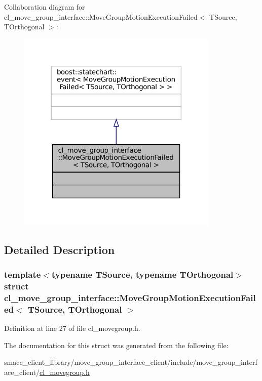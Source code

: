 Collaboration diagram for cl\+\_\+move\+\_\+group\+\_\+interface\+:\+:Move\+Group\+Motion\+Execution\+Failed$<$ T\+Source, T\+Orthogonal $>$\+:
\nopagebreak
\begin{figure}[H]
\begin{center}
\leavevmode
\includegraphics[width=272pt]{structcl__move__group__interface_1_1MoveGroupMotionExecutionFailed__coll__graph}
\end{center}
\end{figure}


\subsection{Detailed Description}
\subsubsection*{template$<$typename T\+Source, typename T\+Orthogonal$>$\newline
struct cl\+\_\+move\+\_\+group\+\_\+interface\+::\+Move\+Group\+Motion\+Execution\+Failed$<$ T\+Source, T\+Orthogonal $>$}



Definition at line 27 of file cl\+\_\+movegroup.\+h.



The documentation for this struct was generated from the following file\+:\begin{DoxyCompactItemize}
\item 
smacc\+\_\+client\+\_\+library/move\+\_\+group\+\_\+interface\+\_\+client/include/move\+\_\+group\+\_\+interface\+\_\+client/\hyperlink{cl__movegroup_8h}{cl\+\_\+movegroup.\+h}\end{DoxyCompactItemize}
